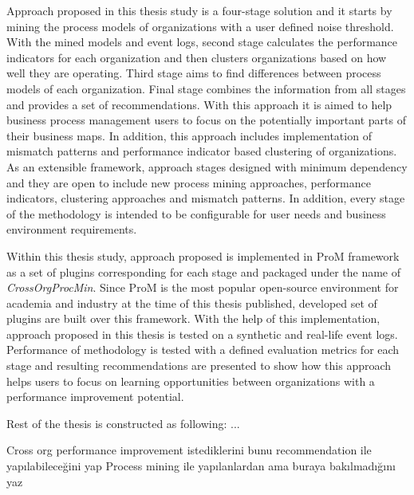Approach proposed in this thesis study is a four-stage solution and it starts by mining the process models of organizations with a user defined noise threshold. With the mined models and event logs, second stage calculates the performance indicators for each organization and then clusters organizations based on how well they are operating. Third stage aims to find differences between process models of each organization. Final stage combines the information from all stages and provides a set of recommendations. With this approach it is aimed to help business process management users to focus on the potentially important parts of their business maps. In addition, this approach includes implementation of mismatch patterns and performance indicator based clustering of organizations. As an extensible framework, approach stages designed with minimum dependency and they are open to include new  process mining approaches, performance indicators, clustering approaches and mismatch patterns. In addition, every stage of the methodology is intended to be configurable for user needs and business environment requirements.

Within this thesis study, approach proposed is implemented in ProM framework \cite{verbeek2010prom} as a set of plugins corresponding for each stage and packaged under the name of \textit{CrossOrgProcMin}. Since ProM is the most popular open-source environment for academia and industry at the time of this thesis published, developed set of plugins are built over this framework. With the help of this implementation, approach proposed in this thesis is tested on a synthetic and real-life event logs. Performance of methodology is tested with a defined evaluation metrics for each stage and resulting recommendations are presented to show how this approach helps users to focus on learning opportunities between organizations with a performance improvement potential. 

Rest of the thesis is constructed as following:
...


Cross org 
performance improvement istediklerini bunu recommendation ile yapılabileceğini yap
Process mining ile yapılanlardan ama buraya bakılmadığını yaz

